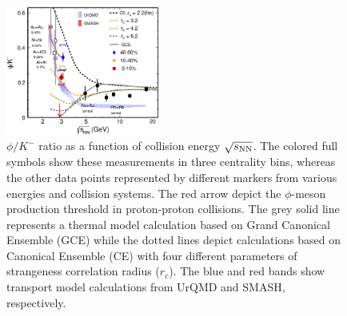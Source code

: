 \documentclass[%
 reprint,	
showpacs,
 amsmath,amssymb,
 aps,
 prc,
]{revtex4-1}
\begin{document}
\begin{figure}
\centering
\includegraphics[width=0.45\textwidth]{fig/fig4_phi_over_kminus_zoomin.eps}
  \caption{ $\phi/K^-$ ratio as a function of collision energy $\sqrt{s_{\rm NN}}$. The colored full symbols show these measurements in three centrality bins, whereas the other data points represented by different markers from various energies and collision systems. The red arrow depict the $\phi$-meson production threshold in proton-proton collisions. The grey solid line represents a thermal model calculation based on Grand Canonical Ensemble (GCE) while the dotted lines depict calculations based on Canonical Ensemble (CE) with four different parameters of strangeness correlation radius ($r_c$). The blue and red bands show transport model calculations from UrQMD and SMASH, respectively.}
\label{fig:phi2Kratio} 
\end{figure}
\end{document}
